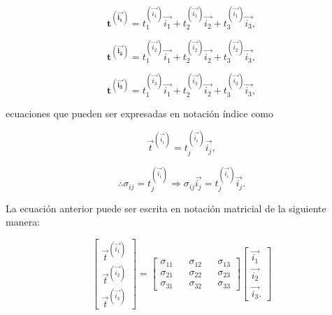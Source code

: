 \documentclass{article}
\begin{document}
    \begin{equation}
        \bm{t^{(\vec{i_{1}})}} = t_{1}^{(\vec{i_{1}})}\vec{i_{1}} + 
        t_{2}^{(\vec{i_{1}})}\vec{i_{2}} + 
        t_{3}^{(\vec{i_{1}})}\vec{i_{3}},
    \end{equation}

    \begin{equation}
        \bm{t^{(\vec{i_{2}})}} = t_{1}^{(\vec{i_{2}})}\vec{i_{1}} + 
        t_{2}^{(\vec{i_{2}})}\vec{i_{2}} + 
        t_{3}^{(\vec{i_{2}})}\vec{i_{3}},
    \end{equation}

    \begin{equation}
        \bm{t^{(\vec{i_{3}})}} = t_{1}^{(\vec{i_{3}})}\vec{i_{1}} + 
        t_{2}^{(\vec{i_{3}})}\vec{i_{2}} + 
        t_{3}^{(\vec{i_{3}})}\vec{i_{3}},
    \end{equation}

    ecuaciones que pueden ser expresadas en notaci\'{o}n \'{i}ndice como

    \begin{equation}
        \vec{t}^{(\vec{i_{i}})} = t_{j}^{(\vec{i_{i}})}\vec{i_{j}},
    \end{equation}

    \begin{equation}
        \therefore \sigma_{ij} = t_{j}^{(\vec{i_{i}})} \Longrightarrow 
        \sigma_{ij}\vec{i_{j}} = t_{j}^{(\vec{i_{i}})}\vec{i_{j}}.
    \end{equation}

    La ecuaci\'{o}n anterior puede ser escrita en notaci\'{o}n matricial de la siguiente manera:

    \begin{equation}
        \begin{bmatrix}
            \vec{t}^{(\vec{i_{1}})} \\
            \vec{t}^{(\vec{i_{2}})} \\
            \vec{t}^{(\vec{i_{3}})}
        \end{bmatrix}
        =
        \begin{bmatrix}
            \sigma_{11} && \sigma_{12} && \sigma_{13} \\
            \sigma_{21} && \sigma_{22} && \sigma_{23} \\
            \sigma_{31} && \sigma_{32} && \sigma_{33}
        \end{bmatrix}
        \begin{bmatrix}
            \vec{i_{1}} \\
            \vec{i_{2}} \\
            \vec{i_{3}}.
        \end{bmatrix}
    \end{equation}
\end{document}
